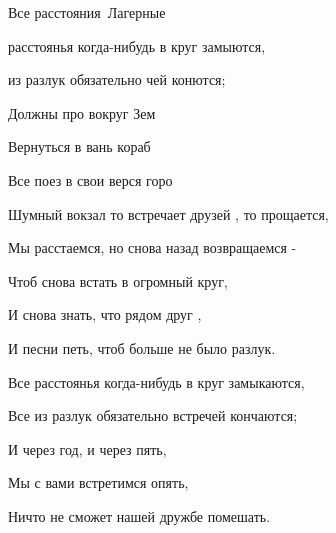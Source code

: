 \documentclass[11pt,a5paper]{book}
\begin{document}
\begin{song}{Все расстояния}{}{~}{Лагерные}{}{}

 расстоянья когда-нибудь в круг замыются,\par
{} из разлук обязательно чей конются;\par
Должны про вокруг Зем\par
Вернуться в вань кораб\par   
Все поез в свои верся горо\par
 
Шумный вокзал то встречает друзей , то прощается,\par
Мы расстаемся, но снова назад возвращаемся -\par
Чтоб снова встать в огромный круг,\par
И снова знать, что рядом друг ,\par
И песни петь, чтоб больше не было разлук.\par
 
Все расстоянья когда-нибудь в круг замыкаются,\par
Все из разлук обязательно встречей кончаются;\par
И через год, и через пять,\par
Мы с вами встретимся опять,\par
Ничто не сможет нашей дружбе помешать.\par
\begin{SBSection*}
\begin{figure}[b!]
\end{figure}
\end{SBSection*}
\end{song}
\end{document}
